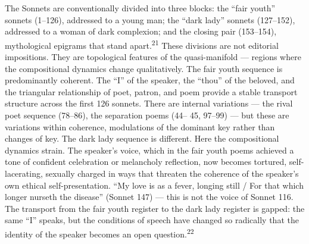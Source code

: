 The Sonnets are conventionally divided into three blocks: the “fair youth” sonnets (1–126), addressed to a young man; the “dark lady” sonnets (127–152), addressed to a woman of dark complexion; and the closing pair (153–154), mythological epigrams that stand apart.\textsuperscript{21} These divisions are not editorial impositions. They are topological features of the quasi-manifold — regions where the compositional dynamics change qualitatively. The fair youth sequence is predominantly coherent. The “I” of the speaker, the “thou” of the beloved, and the triangular relationship of poet, patron, and poem provide a stable transport structure across the first 126 sonnets. There are internal variations — the rival poet sequence (78–86), the separation poems (44– 45, 97–99) — but these are variations within coherence, modulations of the dominant key rather than changes of key. The dark lady sequence is different. Here the compositional dynamics strain. The speaker’s voice, which in the fair youth poems achieved a tone of confident celebration or melancholy reflection, now becomes tortured, self-lacerating, sexually charged in ways that threaten the coherence of the speaker’s own ethical self-presentation. “My love is as a fever, longing still / For that which longer nurseth the disease” (Sonnet 147) — this is not the voice of Sonnet 116. The transport from the fair youth register to the dark lady register is gapped: the same “I” speaks, but the conditions of speech have changed so radically that the identity of the speaker becomes an open question.\textsuperscript{22}

